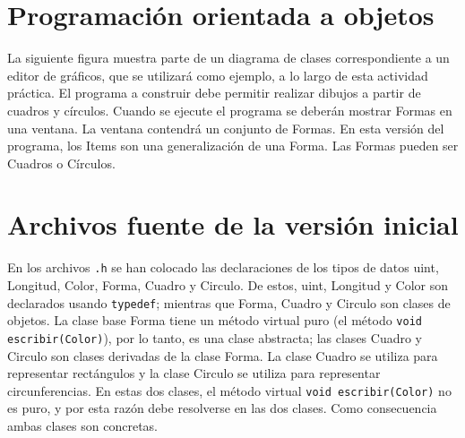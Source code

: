 \documentclass[11pt]{article}
\begin{document}
\section*{Programaci\'{o}n orientada a objetos}
La siguiente f\/igura muestra parte de un diagrama de clases correspondiente a un 
editor de gr\'{a}ficos, que se utilizar\'{a} como ejemplo, a lo largo de esta 
actividad pr\'{a}ctica. El programa a construir debe permitir realizar dibujos 
a partir de cuadros y c\'{i}rculos. Cuando se ejecute el programa se deber\'{a}n 
mostrar Formas en una ventana. La ventana contendr\'{a} un conjunto de Formas. En 
esta versi\'{o}n del programa, los Items son una generalización de una Forma. Las 
Formas pueden ser Cuadros o C\'{i}rculos.
\begin{center}
\end{center}
\section*{Archivos fuente de la versi\'{o}n inicial}
En los archivos {\tt .h} se han colocado las declaraciones de los tipos de datos uint, Longitud, 
Color, Forma, Cuadro y Circulo. De estos, uint, Longitud y Color son declarados usando {\tt typedef}; 
mientras que Forma, Cuadro y Circulo son clases de objetos. La clase base Forma tiene un m\'{e}todo 
virtual puro (el m\'{e}todo {\tt void escribir(Color)}), por lo tanto, es una clase abstracta; las clases 
Cuadro y Circulo son clases derivadas de la clase Forma. La clase Cuadro se utiliza para representar 
rect\'{a}ngulos y la clase Circulo se utiliza para representar circunferencias. En estas dos clases, 
el m\'{e}todo virtual {\tt void escribir(Color)} no es puro, y por esta raz\'{o}n debe resolverse en 
las dos clases. Como consecuencia ambas clases son concretas.
\end{document}
